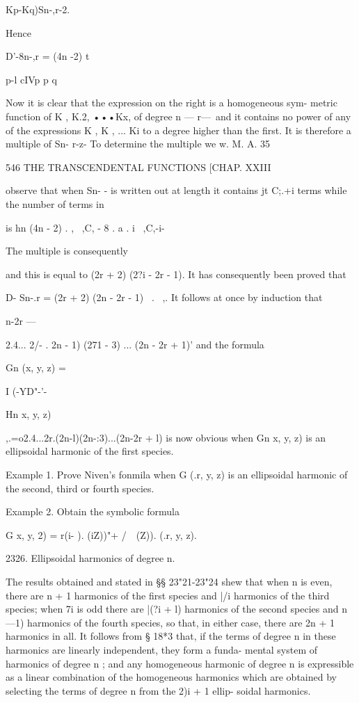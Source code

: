 {{ Kp-Kq)Sn-,r-2.

Hence

D'-8n-,r = (4n -2) t

p-l cIVp p q

Now it is clear that the expression on the right is a homogeneous sym-
metric function of K , K.2, •••Kx, of degree n — r—\, and it contains
no power of any of the expressions K , K , ... Ki to a degree higher
than the first. It is therefore a multiple of Sn- r-z- To determine
the multiple we w. M. A. 35

546 THE TRANSCENDENTAL FUNCTIONS [CHAP. XXIII

observe that when Sn- - is written out at length it contains jt C;.+i
terms while the number of terms in

is hn (4n - 2) . , \ ,C, - 8 . a . i \ ,C,-i-

The multiple is consequently

and this is equal to (2r + 2) (2?i - 2r - 1). It has consequently been
proved that

D- Sn-.r = (2r + 2) (2n - 2r - 1) \ . \ ,. It follows at once by
induction that

 n-2r —

2.4... 2/- . 2n - 1) (271 - 3) ... (2n - 2r + 1)' and the formula

Gn (x, y, z) =

I (-YD"-'-

Hn x, y, z)

,.=o2.4...2r.(2n-l)(2n-:3)...(2n-2r + l) is now obvious when Gn x, y,
z) is an ellipsoidal harmonic of the first species.

Example 1. Prove Niven's fonmila when G (.r, y, z) is an ellipsoidal
harmonic of the second, third or fourth species.

Example 2. Obtain the symbolic formula

G x, y, 2) = r(i- ). (iZ))"+ /\ \ (Z)). (.r, y, z).

2326. Ellipsoidal harmonics of degree n.

The results obtained and stated in §§ 23"21-23"24 shew that when n is
even, there are n + 1 harmonics of the first species and |/i harmonics
of the third species; when 7i is odd there are |(?i + l) harmonics of
the second species and n —1) harmonics of the fourth species, so that,
in either case, there are 2n + 1 harmonics in all. It follows from §
18*3 that, if the terms of degree n in these harmonics are linearly
independent, they form a funda- mental system of harmonics of degree n
; and any homogeneous harmonic of degree n is expressible as a linear
combination of the homogeneous harmonics which are obtained by
selecting the terms of degree n from the 2)i + 1 ellip- soidal
harmonics.

}}

